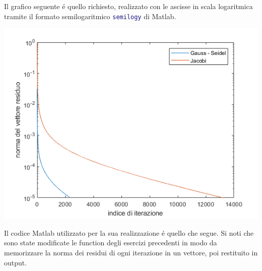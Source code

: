 \begin{center}
\footnotesize\noindent{}
\end{center}

\noindent Il grafico seguente \'e quello richiesto, realizzato con le ascisse in scala logaritmica tramite il formato semilogaritmico \lstinline[language=Matlab]{semilogy} di Matlab.

\begin{center}
	\includegraphics[scale=0.9]{cap6/6_5.png}
\end{center}

\noindent Il codice Matlab utilizzato per la sua realizzazione \'e quello che segue. Si noti che sono state modificate le function degli esercizi precedenti in modo da memorizzare la norma dei residui di ogni iterazione in un vettore, poi restituito in output.


